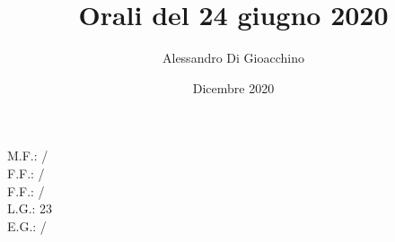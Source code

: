 \documentclass{article}
\title{Orali del 24 giugno 2020}
\author{Alessandro Di Gioacchino}
\date{Dicembre 2020}
\begin{document}
    \maketitle
    
    M.F.: / \\
    F.F.: / \\
    F.F.: / \\
    L.G.: 23 \\
    E.G.: / \\
    
\end{document}
